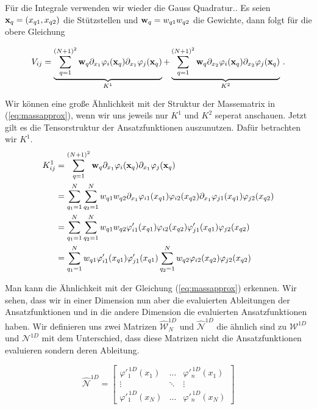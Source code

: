 Für die Integrale verwenden wir wieder die Gauss Quadratur.. Es seien $\bold{x}_q=(x_{q1},x_{q2})$ die Stützstellen und $\bold{w}_q=w_{q1}w_{q2}$ die Gewichte, dann folgt für die obere Gleichung

\begin{equation}
\begin{aligned}
V_{ij}  = \underbrace{\sum\limits_{q=1}^{(N+1)^2} \bold{w}_q \partial_{x_1}  \varphi_i(\bold{x}_q)  \partial_{x_1} \varphi_j (\bold{x}_q)}_{K^1} + \underbrace{\sum\limits_{q=1}^{(N+1)^2} \bold{w}_q  \partial_{x_2} \varphi_i(\bold{x}_q)  \partial_{x_2} \varphi_j(\bold{x}_q)}_{K^2} \, .
\end{aligned}
\end{equation}

Wir können eine große Ähnlichkeit mit der Struktur der Massematrix in (\ref{eq:massapprox}), wenn wir uns jeweils nur $K^1$ und $K^2$ seperat anschauen. Jetzt gilt es die Tensorstruktur der Ansatzfunktionen auszunutzen. Dafür betrachten wir $K^1$.
\begin{equation}
\begin{aligned}
K_{ij}^1 &=\sum\limits_{q=1}^{(N+1)^2} \bold{w}_q \partial_{x_1}  \varphi_i(\bold{x}_q)  \partial_{x_1} \varphi_j (\bold{x}_q) \\ &= \sum\limits_{q_1=1}^{N} \sum\limits_{q_2=1}^{N} w_{q1}w_{q2} \partial_{x_1}  \varphi_{i1}(x_{q1})\varphi_{i2}(x_{q2})  \partial_{x_1} \varphi_{j1} (x_{q1})\varphi_{j2} (x_{q2}) \\
&=  \sum\limits_{q_1=1}^{N} \sum\limits_{q_2=1}^{N} w_{q1}w_{q2} \varphi'_{i1}(x_{q1})\varphi_{i2}(x_{q2})  \varphi'_{j1} (x_{q1})\varphi_{j2} (x_{q2}) \\ 
&= \sum\limits_{q_1=1}^{N} w_{q1} \varphi'_{i1}(x_{q1}) \varphi'_{j1} (x_{q1}) \sum\limits_{q_2=1}^{N} w_{q2} \varphi_{i2}(x_{q2})  \varphi_{j2} (x_{q2}) 
\end{aligned}
\end{equation}

Man kann die Ähnlichkeit mit der Gleichung (\ref{eq:massapprox}) erkennen. Wir sehen, dass wir in einer Dimension nun aber die evaluierten Ableitungen der Ansatzfunktionen und in die andere Dimension die evaluierten Ansatzfunktionen haben.
Wir definieren uns zwei Matrizen $\widehat{\mathcal{W}}^{1D}_N$ und $\widehat{\mathcal{N}}^{1D}$ die ähnlich sind zu $\mathcal{W}^{1D}$ und $\mathcal{N}^{1D}$ mit dem Unterschied, dass diese Matrizen nicht die Ansatzfunktionen evaluieren sondern deren Ableitung.

\begin{equation}
\widehat{\mathcal{N}}^{1D} = 
\begin{bmatrix}
\varphi'^{ \, 1D}_1(x_1) & \hdots &  \varphi'^{ \, 1D}_n(x_1) \\
\vdots & \ddots & \vdots \\
\varphi'^{ \, 1D}_1(x_N)& \hdots & \varphi'^{ \, 1D}_n(x_N)
\end{bmatrix}
\end{equation}

